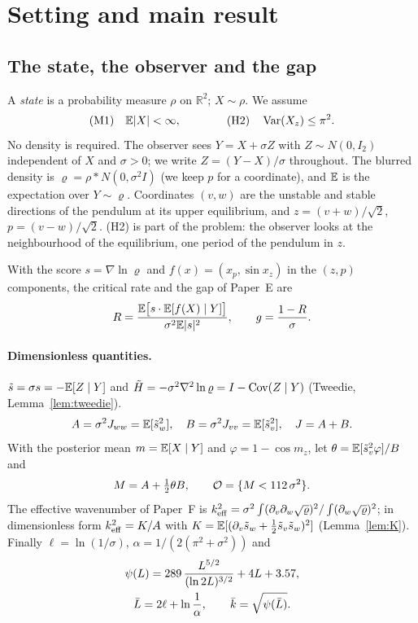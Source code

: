 \section{Setting and main result}
\label{sec:main}

\subsection{The state, the observer and the gap}
A \emph{state} is a probability measure $\rho$ on $\mathbb R^2$; $X\sim\rho$.
We assume
\begin{equation}
\text{(M1)}\quad \mathbb{E}|X|<\infty,\qquad\qquad \text{(H2)}\quad \operatorname{Var}(X_z)\le\pi^2 .
\label{eq:assumptions}
\end{equation}
No density is required.
The observer sees $Y=X+\sigma Z$ with $Z\sim N(0,I_2)$ independent of $X$ and $\sigma>0$; we write $Z=(Y-X)/\sigma$ throughout.
The blurred density is $\varrho=\rho*N(0,\sigma^2 I)$ (we keep $p$ for a coordinate), and $\mathbb{E}$ is the expectation over $Y\sim\varrho$.
Coordinates $(v,w)$ are the unstable and stable directions of the pendulum at its upper equilibrium, and
$z=(v+w)/\sqrt2$, $p=(v-w)/\sqrt2$.
(H2) is part of the problem: the observer looks at the neighbourhood of the equilibrium, one period of the pendulum in $z$.

With the score $s=\nabla\ln\varrho$ and $f(x)=(x_p,\sin x_z)$ in the $(z,p)$ components, the critical rate and the gap of Paper~E are
\begin{equation}
R=\frac{\mathbb{E}\big[s\cdot\mathbb{E}[f(X)\mid Y]\big]}{\sigma^2\mathbb{E}|s|^2},\qquad g=\frac{1-R}{\sigma}.
\end{equation}

\paragraph*{Dimensionless quantities.}
$\tilde s=\sigma s=-\mathbb{E}[Z\mid Y]$ and $\tilde H=-\sigma^2\nabla^2\ln\varrho=I-\operatorname{Cov}(Z\mid Y)$ (Tweedie, Lemma~\ref{lem:tweedie}).
\begin{equation}
A=\sigma^2J_{ww}=\mathbb{E}[\tilde s_w^2],\quad B=\sigma^2J_{vv}=\mathbb{E}[\tilde s_v^2],\quad J=A+B .
\end{equation}
With the posterior mean $m=\mathbb{E}[X\mid Y]$ and $\varphi=1-\cos m_z$, let $\theta=\mathbb{E}[\tilde s_v^2\varphi]/B$ and
\begin{equation}
M=A+\tfrac12\theta B,\qquad \mathcal O=\{M<112\,\sigma^2\}.
\label{eq:Oset}
\end{equation}
The effective wavenumber of Paper~F is $k_{\mathrm{eff}}^2=\sigma^2\int(\partial_v\partial_w\sqrt\varrho)^2/\int(\partial_w\sqrt\varrho)^2$; in dimensionless form $k_{\mathrm{eff}}^2=K/A$ with $K=\mathbb{E}[(\partial_v\tilde s_w+\tfrac12\tilde s_v\tilde s_w)^2]$ (Lemma~\ref{lem:K}).
Finally $\ell=\ln(1/\sigma)$, $\alpha=1/(2(\pi^2+\sigma^2))$ and
\begin{equation}
\begin{gathered}
\psi(L)=289\,\frac{L^{5/2}}{(\ln2L)^{3/2}}+4L+3.57,\\ \bar L=2\ell+\ln\frac1\alpha,\qquad \bar k=\sqrt{\psi(\bar L)} .
\end{gathered}
\label{eq:psi}
\end{equation}

